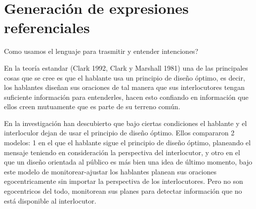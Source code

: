 \chapter{Generaci\'on de expresiones referenciales}
\label{sec:seleccion}

Como usamos el lenguaje para trasmitir y entender intenciones? 

En la teor\'ia estandar (Clark 1992, Clark y Marshall 1981) una de las principales cosas que se cree es que el hablante usa un principio de dise\~no \'optimo, es decir, los hablantes dise\~nan sus oraciones de tal manera que sus interlocutores tengan suficiente informaci\'on para entenderles, hacen esto confiando en informaci\'on que ellos creen mutuamente que es parte de su terreno com\'un. 


En la investigaci\'on \cite{keysar:Curr98} han descubierto que bajo ciertas condiciones el hablante y el interloculor dejan de usar el principio de dise\~no \'optimo. %
Ellos compararon 2 modelos: 1 en el que el hablante sigue el principio de dise\~no \'optimo, planeando el mensaje teniendo en consideraci\'on la perspectiva del interlocutor, y otro en el que un dise\~no orientada al p\'ublico es m\'as bien una idea de \'ultimo momento, bajo este modelo de monitorear-ajustar los hablantes planean sus oraciones egocentricamente sin importar la perspectiva de los interlocutores. Pero no son egocentricos del todo, monitorean sus planes para detectar informaci\'on que no est\'a disponible al interlocutor.

